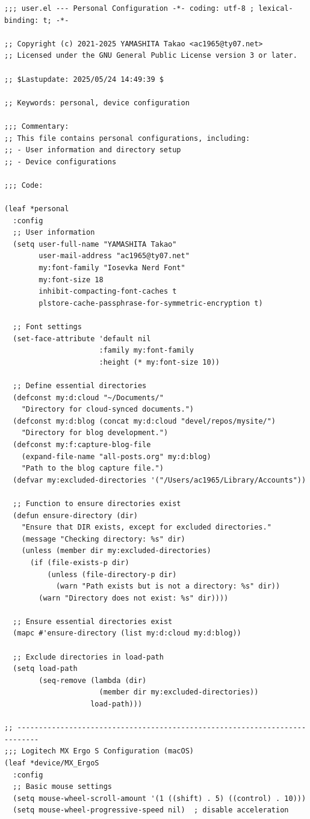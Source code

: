 \documentclass[11pt]{article}
\begin{document}
\begin{verbatim}
;;; user.el --- Personal Configuration -*- coding: utf-8 ; lexical-binding: t; -*-

;; Copyright (c) 2021-2025 YAMASHITA Takao <ac1965@ty07.net>
;; Licensed under the GNU General Public License version 3 or later.

;; $Lastupdate: 2025/05/24 14:49:39 $

;; Keywords: personal, device configuration

;;; Commentary:
;; This file contains personal configurations, including:
;; - User information and directory setup
;; - Device configurations

;;; Code:

(leaf *personal
  :config
  ;; User information
  (setq user-full-name "YAMASHITA Takao"
        user-mail-address "ac1965@ty07.net"
        my:font-family "Iosevka Nerd Font"
        my:font-size 18
        inhibit-compacting-font-caches t
        plstore-cache-passphrase-for-symmetric-encryption t)

  ;; Font settings
  (set-face-attribute 'default nil
                      :family my:font-family
                      :height (* my:font-size 10))

  ;; Define essential directories
  (defconst my:d:cloud "~/Documents/"
    "Directory for cloud-synced documents.")
  (defconst my:d:blog (concat my:d:cloud "devel/repos/mysite/")
    "Directory for blog development.")
  (defconst my:f:capture-blog-file
    (expand-file-name "all-posts.org" my:d:blog)
    "Path to the blog capture file.")
  (defvar my:excluded-directories '("/Users/ac1965/Library/Accounts"))

  ;; Function to ensure directories exist
  (defun ensure-directory (dir)
    "Ensure that DIR exists, except for excluded directories."
    (message "Checking directory: %s" dir)
    (unless (member dir my:excluded-directories)
      (if (file-exists-p dir)
          (unless (file-directory-p dir)
            (warn "Path exists but is not a directory: %s" dir))
        (warn "Directory does not exist: %s" dir))))

  ;; Ensure essential directories exist
  (mapc #'ensure-directory (list my:d:cloud my:d:blog))

  ;; Exclude directories in load-path
  (setq load-path
        (seq-remove (lambda (dir)
                      (member dir my:excluded-directories))
                    load-path)))

;; ---------------------------------------------------------------------------
;;; Logitech MX Ergo S Configuration (macOS)
(leaf *device/MX_ErgoS
  :config
  ;; Basic mouse settings
  (setq mouse-wheel-scroll-amount '(1 ((shift) . 5) ((control) . 10)))
  (setq mouse-wheel-progressive-speed nil)  ; disable acceleration


\end{verbatim}
\end{document}
